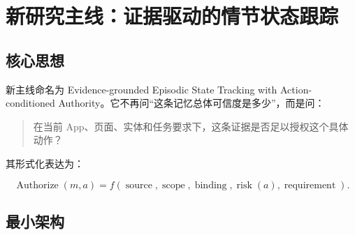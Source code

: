 \documentclass[12pt,a4paper]{ctexart}
\begin{document}
\iffalse %
\section{新研究主线：证据驱动的情节状态跟踪}

\subsection{核心思想}

新主线命名为 Evidence-grounded Episodic State Tracking with Action-conditioned Authority。它不再问“这条记忆总体可信度是多少”，而是问：

\begin{quote}
在当前 App、页面、实体和任务要求下，这条证据是否足以授权这个具体动作？
\end{quote}

其形式化表达为：

\begin{equation}
    \operatorname{Authorize}(m,a)=
    f(\operatorname{source},\operatorname{scope},\operatorname{binding},
    \operatorname{risk}(a),\operatorname{requirement}).
\end{equation}

\subsection{最小架构}
\end{document}
